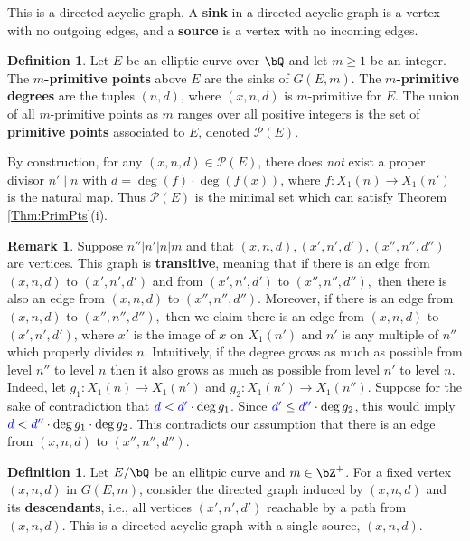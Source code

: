 \documentclass[11pt,reqno]{amsart}
\theoremstyle{plain}
\theoremstyle{definition}
\newtheorem{remark}[theorem]{Remark}
\newtheorem{definition}[theorem]{Definition}
\newcommand{\Q}{\bQ}
\newcommand{\Z}{\bZ}
\newcommand{\abedit}[1]{{\color{blue} #1}}
\begin{document}
This is a directed acyclic graph. A \textbf{sink} in a directed acyclic graph is a vertex with no outgoing edges, and a \textbf{source} is a vertex with no incoming edges.

\begin{definition}\label{def:mprimitive}
    Let $E$ be an elliptic curve over $\Q$ and let $m\geq 1$ be an integer. The \textbf{$m$-primitive points} above $E$ are the sinks of $G(E,m)$. The \textbf{$m$-primitive degrees} are the tuples $(n,d)$, where $(x,n,d)$ is $m$-primitive for $E$. The union of all $m$-primitive points as $m$ ranges over all positive integers is the set of \textbf{primitive points} associated to $E$, denoted $\mathcal{P}(E)$.
\end{definition}

\abedit{By construction, for any $(x,n,d) \in \mathcal{P}(E)$, there does \emph{not} exist a proper divisor $n' \mid n$ with $d=\deg(f) \cdot \deg(f(x))$, where $f: X_1(n) \rightarrow X_1(n')$ is the natural map. Thus $\mathcal{P}(E)$ is the minimal set which can satisfy Theorem \ref{Thm:PrimPts}(i).}

\begin{remark}\label{Remark:Transitivity}
Suppose $n'' | n' | n | m$ and that $(x,n,d), (x',n',d'), (x'',n'',d'')$ are vertices. This graph is \textbf{transitive}, meaning that if there is an edge from $(x,n,d)$ to $(x',n',d')$ and from $(x',n',d')$ to $(x'',n'',d''),$ then
there is also an edge from $(x,n,d)$ to $(x'',n'',d'')$. Moreover, if there is an edge from $(x,n,d)$ to $(x'',n'',d''),$ then we  claim there is an edge from $(x,n,d)$ to $(x',n',d')$, \abedit{where $x'$ is the image of $x$ on $X_1(n')$ and $n'$ is any multiple of $n''$ which properly divides $n$}. Intuitively, if the degree grows as much as possible from level $n''$ to level $n$ then it also grows as much as possible from level $n'$ to level $n$. Indeed, let $g_1:X_1(n) \rightarrow X_1(n')$ and $g_2:X_1(n') \rightarrow X_1(n'')$. Suppose for the sake of contradiction that  $\abedit{d}<\abedit{d'}\cdot\deg g_1$. Since $\abedit{d'} \leq \abedit{d''} \cdot \deg g_2$, this would imply $\abedit{d}<\abedit{d''} \cdot\deg g_1\cdot \deg g_2 $. This contradicts our assumption that there is an edge from $(x,n,d)$ to $(x'',n'',d'')$.
\end{remark}


\begin{definition}
Let $E/\Q$ be an ellitpic curve and $m \in \Z^+$. For a fixed vertex $(x,n,d)$ in $G(E,m)$, consider the directed graph induced by $(x,n,d)$ and its \textbf{descendants}, i.e., all vertices $(x',n',d')$ reachable by a path from $(x,n,d)$. This is a directed acyclic graph with a single source, $(x,n,d)$.  
\end{definition}
\end{document}
